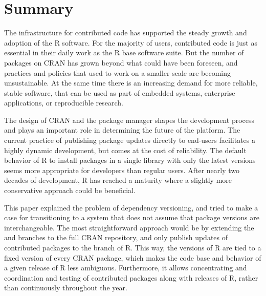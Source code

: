 
\section{Summary}

The infrastructure for contributed code has supported the steady growth and
adoption of the R software. For the majority of users, contributed code is just
as essential in their daily work as the R base software suite. But the number
of packages on CRAN has grown beyond what could have been foreseen, and
practices and policies that used to work on a smaller scale are becoming
unsustainable. At the same time there is an increasing demand for more
reliable, stable software, that can be used as part of embedded systems,
enterprise applications, or reproducible research.

The design of CRAN and the package manager shapes the development process and
plays an important role in determining the future of the platform. The current
practice of publishing package updates directly to end-users facilitates a
highly dynamic development, but comes at the cost of reliability. The default
behavior of R to install packages in a single library with only the latest
versions seems more appropriate for developers than regular users. After nearly
two decades of development, R has reached a maturity where a slightly more
conservative approach could be beneficial.

This paper explained the problem of dependency versioning, and tried to make
a case for transitioning to a system that does not assume that package versions
are interchangeable. The most straightforward approach would be by extending
the  and  branches to the full CRAN repository, and
only publish updates of contributed packages to the 
branch of R. This way, the  versions of R are tied to a fixed
version of every CRAN package, which makes the code base and behavior of a
given release of R less ambiguous. Furthermore, it allows concentrating
and coordination and testing of contributed packages along with releases of R,
rather than continuously throughout the year.

